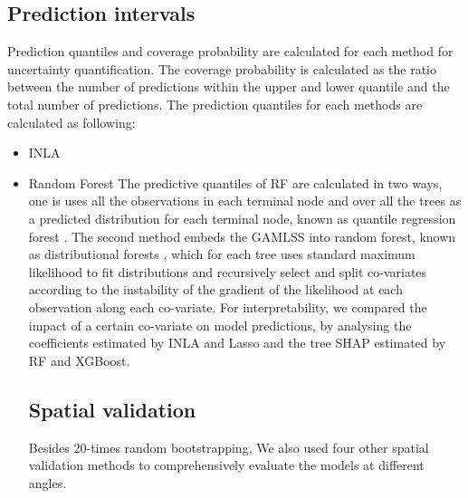 \documentclass{article}
\begin{document}
\subsection {Prediction intervals}
Prediction quantiles and coverage probability are calculated for each method for uncertainty quantification. The coverage probability is calculated as the ratio between the number of  predictions within the upper and lower quantile and the total number of predictions. The prediction quantiles for each methods are calculated as following:
\begin{itemize}
     
\item INLA

\item Random Forest 
 The predictive quantiles of RF are calculated in two ways, one is uses all the observations in each terminal node and over all the trees as a predicted distribution for each terminal node, known as quantile regression forest \citep{meinshausen2006quantile}. The second method embeds the GAMLSS \citep{stasinopoulos2007generalized} into random forest, known as distributional forests \citep{schlosser2019distributional}, which for each tree uses standard maximum likelihood to fit distributions and recursively select and split co-variates according to the instability of the gradient of the likelihood at each observation along each co-variate. For interpretability, we compared the impact of a certain co-variate on model predictions, by analysing the coefficients estimated by INLA and Lasso and the tree SHAP \citep[SHapley Additive exPlanations,][]{lundberg2018explainable} estimated by RF and XGBoost.  

\subsection{Spatial validation}
Besides 20-times random bootstrapping, We also used four other spatial validation methods to comprehensively evaluate the models at different angles.


\end{itemize}
\end{document}
